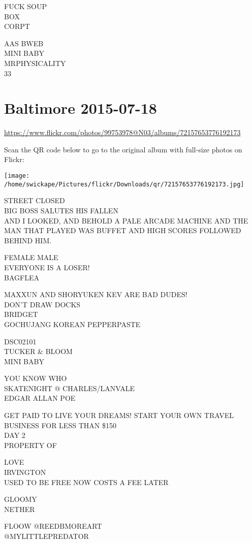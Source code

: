 \documentclass[10pt,letterpaper]{article}
\begin{document}
FUCK SOUP\\
BOX\\
CORPT

AAS BWEB\\
MINI BABY\\
MRPHYSICALITY\\
33


\section*{Baltimore 2015-07-18}

\url{https://www.flickr.com/photos/99753978@N03/albums/72157653776192173}

Scan the QR code below to go to the original album with full-size photos on Flickr:

\texttt{[image: /home/swickape/Pictures/flickr/Downloads/qr/72157653776192173.jpg]}


STREET CLOSED\\
BIG BOSS SALUTES HIS FALLEN\\
AND I LOOKED, AND BEHOLD A PALE ARCADE MACHINE AND THE MAN THAT PLAYED WAS BUFFET AND HIGH SCORES FOLLOWED BEHIND HIM.

FEMALE MALE\\
EVERYONE IS A LOSER!\\
BAGFLEA

MAXXUN AND SHORYUKEN KEV ARE BAD DUDES!\\
DON'T DRAW DOCKS\\
BRIDGET\\
GOCHUJANG KOREAN PEPPERPASTE

DSC02101\\
TUCKER \& BLOOM\\
MINI BABY

YOU KNOW WHO\\
SKATENIGHT @ CHARLES/LANVALE\\
EDGAR ALLAN POE

GET PAID TO LIVE YOUR DREAMS!  START YOUR OWN TRAVEL BUSINESS FOR LESS THAN \$150\\
DAY 2\\
PROPERTY OF

LOVE\\
IRVINGTON\\
USED TO BE FREE NOW COSTS A FEE LATER

GLOOMY\\
NETHER

FLOOW @REEDBMOREART\\
@MYLITTLEPREDATOR
\end{document}
